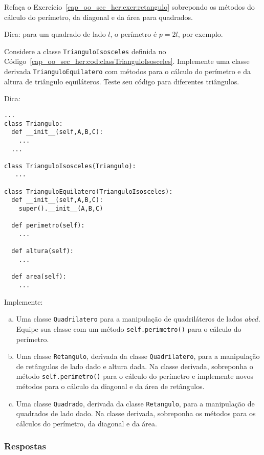 \begin{exer}
  Refaça o Exercício~\ref{cap_oo_sec_her:exer:retangulo} sobrepondo os métodos do cálculo do perímetro, da diagonal e da área para quadrados.
\end{exer}
\begin{resp}
  Dica: para um quadrado de lado $l$, o perímetro é $p = 2l$, por exemplo.
\end{resp}

\begin{exer}
  Considere a classe \texttt{TrianguloIsosceles} definida no Código~\ref{cap_oo_sec_her:cod:classTrianguloIsosceles}. Implemente uma classe derivada \lstinline+TrianguloEquilatero+ com métodos para o cálculo do perímetro e da altura de triângulo equiláteros. Teste seu código para diferentes triângulos.
\end{exer}
\begin{resp}
  Dica:

\begin{lstlisting}
...
class Triangulo:
  def __init__(self,A,B,C):
    ...
  ...

class TrianguloIsosceles(Triangulo):
   ...

class TrianguloEquilatero(TrianguloIsosceles):
  def __init__(self,A,B,C):
    super().__init__(A,B,C)

  def perimetro(self):
    ...

  def altura(self):
    ...
   
  def area(self):
    ...
\end{lstlisting}

\end{resp}

\begin{exer}
  Implemente:
  \begin{enumerate}[a)]
  \item Uma classe \lstinline+Quadrilatero+ para a manipulação de quadriláteros de lados $abcd$. Equi\-pe sua classe com um método \lstinline+self.perimetro()+ para o cálculo do perímetro.
  \item Uma classe \lstinline+Retangulo+, derivada da classe \lstinline+Quadrilatero+, para a manipulação de retângulos de lado dado e altura dada. Na classe derivada, sobreponha o método \lstinline+self.perimetro()+ para o cálculo do perímetro e implemente novos métodos para o cálculo da diagonal e da área de retângulos.
  \item Uma classe \lstinline+Quadrado+, derivada da classe \lstinline+Retangulo+, para a manipulação de quadrados de lado dado. Na classe derivada, sobreponha os métodos para os cálculos do perímetro, da diagonal e da área.
  \end{enumerate}
\end{exer}

\ifisbook
\subsubsection{Respostas}
\shipoutAnswer
\fi
